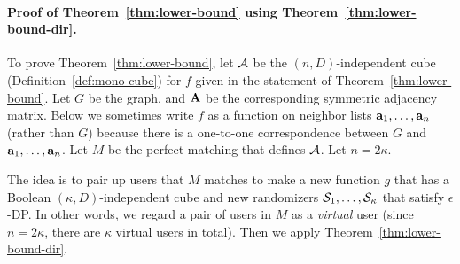 {\paragraph{Proof of Theorem~\ref{thm:lower-bound} using Theorem~\ref{thm:lower-bound-dir}.}
To prove Theorem~\ref{thm:lower-bound}, let $\mathcal{A}$ be the $(n,D)$-independent 
cube (Definition~\ref{def:mono-cube}) for $f$ given in the statement of
Theorem~\ref{thm:lower-bound}. Let $G$ be the graph, 
and 
$\mathbf{A}$ be the corresponding symmetric adjacency matrix. 
Below we sometimes write $f$ as a function on neighbor lists $\mathbf{a}_1, \ldots, \mathbf{a}_n$ (rather than $G$) because there is a one-to-one correspondence between $G$ and $\mathbf{a}_1, \ldots, \mathbf{a}_n$.
Let $M$ be the perfect
matching that defines $\mathcal{A}$. Let $n=2\kappa$.

The idea is to pair up users that $M$ matches to make a new function $g$ that has a Boolean $(\kappa,D)$-independent cube and new randomizers $\mathcal{S}_1, \ldots, \mathcal{S}_\kappa$ that
satisfy $\epsilon$-DP. 
In other words, we regard a pair of users in $M$ as a \textit{virtual} user (since $n=2\kappa$, there are $\kappa$ virtual users in total). 
Then we apply Theorem~\ref{thm:lower-bound-dir}. 

}
